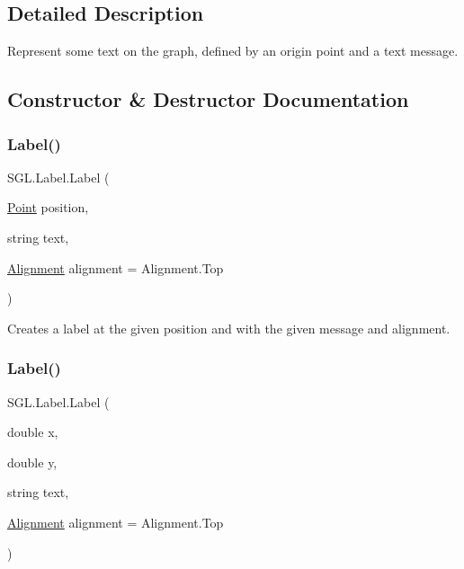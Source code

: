 \subsection{Detailed Description}
Represent some text on the graph, defined by an origin point and a text message. 



\subsection{Constructor \& Destructor Documentation}
\mbox{\label{class_s_g_l_1_1_label_a1be3c869e06d8fc2da560a4fec1be8fd}} 
\subsubsection{\texorpdfstring{Label()}{Label()}\hspace{0.1cm}{\footnotesize\ttfamily [1/2]}}
{\footnotesize\ttfamily S\+G\+L.\+Label.\+Label (\begin{DoxyParamCaption}\item[{\mbox{\hyperlink{struct_s_g_l_1_1_point}{Point}}}]{position,  }\item[{string}]{text,  }\item[{\mbox{\hyperlink{namespace_s_g_l_aa8de446c655c151ef21cfe27b24da87c}{Alignment}}}]{alignment = {\ttfamily Alignment.Top} }\end{DoxyParamCaption})\hspace{0.3cm}{\ttfamily [inline]}}



Creates a label at the given position and with the given message and alignment. 

\mbox{\label{class_s_g_l_1_1_label_a11a9b6b3f98a52007ae874d22dc2f348}} 
\subsubsection{\texorpdfstring{Label()}{Label()}\hspace{0.1cm}{\footnotesize\ttfamily [2/2]}}
{\footnotesize\ttfamily S\+G\+L.\+Label.\+Label (\begin{DoxyParamCaption}\item[{double}]{x,  }\item[{double}]{y,  }\item[{string}]{text,  }\item[{\mbox{\hyperlink{namespace_s_g_l_aa8de446c655c151ef21cfe27b24da87c}{Alignment}}}]{alignment = {\ttfamily Alignment.Top} }\end{DoxyParamCaption})\hspace{0.3cm}{\ttfamily [inline]}}



